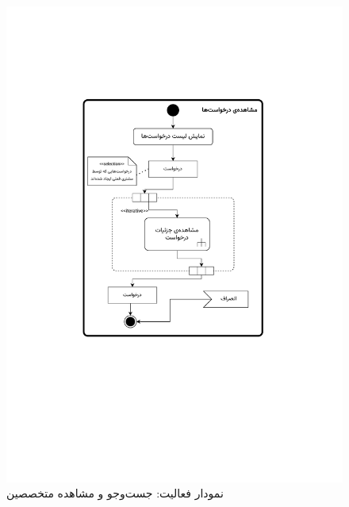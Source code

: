 \begin{figure}[ht!]
	\centering
	\includegraphics[scale=0.8, page=8]{figs/OOD-activity11-20.pdf}
	\caption{نمودار فعالیت: جست‌وجو و مشاهده متخصصین}
\end{figure}
\FloatBarrier
\newpage

